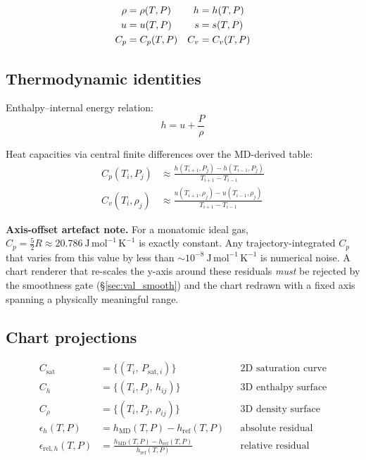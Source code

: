 \documentclass[11pt, a4paper, oneside]{article}
\begin{document}
\begin{align}
  \rho &= \rho(T,P) & h &= h(T,P) \notag \\
  u    &= u(T,P)    & s &= s(T,P) \notag \\
  C_p  &= C_p(T,P)  & C_v &= C_v(T,P)
\end{align}

\subsection{Thermodynamic identities}

Enthalpy--internal energy relation:
\begin{equation}
  h = u + \frac{P}{\rho}
  \label{eq:enthalpy}
\end{equation}

Heat capacities via central finite differences over the MD-derived table:
\begin{align}
  C_p(T_i, P_j) &\approx \frac{h(T_{i+1}, P_j) - h(T_{i-1}, P_j)}{T_{i+1} - T_{i-1}}
  \label{eq:Cp_fd} \\[4pt]
  C_v(T_i, \rho_j) &\approx \frac{u(T_{i+1}, \rho_j) - u(T_{i-1}, \rho_j)}{T_{i+1} - T_{i-1}}
  \label{eq:Cv_fd}
\end{align}

\noindent\textbf{Axis-offset artefact note.} For a monatomic ideal gas,
$C_p = \frac{5}{2}R \approx 20.786\ \mathrm{J\,mol^{-1}\,K^{-1}}$ is
exactly constant. Any trajectory-integrated $C_p$ that varies from this value
by less than $\sim 10^{-8}\ \mathrm{J\,mol^{-1}\,K^{-1}}$ is numerical noise.
A chart renderer that re-scales the y-axis around these residuals \emph{must}
be rejected by the smoothness gate (\S\ref{sec:val_smooth}) and the chart
redrawn with a fixed axis spanning a physically meaningful range.

\subsection{Chart projections}

\begin{align}
  C_{\mathrm{sat}} &= \{(T_i,\, P_{\mathrm{sat},i})\}
  && \text{2D saturation curve} \label{eq:c_sat} \\[4pt]
  C_h             &= \{(T_i, P_j,\, h_{ij})\}
  && \text{3D enthalpy surface} \label{eq:c_h} \\[4pt]
  C_\rho          &= \{(T_i, P_j,\, \rho_{ij})\}
  && \text{3D density surface} \label{eq:c_rho} \\[4pt]
  \epsilon_h(T,P) &= h_{\mathrm{MD}}(T,P) - h_{\mathrm{ref}}(T,P)
  && \text{absolute residual} \label{eq:c_res} \\[4pt]
  \epsilon_{\mathrm{rel},h}(T,P) &=
    \frac{h_{\mathrm{MD}}(T,P) - h_{\mathrm{ref}}(T,P)}{h_{\mathrm{ref}}(T,P)}
  && \text{relative residual} \label{eq:c_relres}
\end{align}
\end{document}
